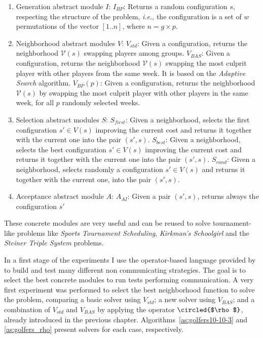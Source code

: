 \begin{enumerate}
	\item Generation abstract module $I$:
	\subitem $I_{BP}$: Returns a random configuration $s$, respecting the structure of the problem, {\it i.e.}, the configuration is a set of $w$ permutations of the vector $[1..n]$, where $n=g\times p$.
	\item Neighborhood abstract modules $V$:
	\subitem $V_{std}$: Given a configuration, returns the neighborhood $\mathcal{V}\left(s\right)$ swapping players among groups.
	\subitem $V_{BAS}$: Given a configuration, returns the neighborhood $\mathcal{V}\left(s\right)$ swapping the most culprit player with other players from the same week. It is based on the {\it Adaptive Search} algorithm.
	\subitem $V_{BP}(p)$: Given a configuration, returns the neighborhood $\mathcal{V}\left(s\right)$ by swapping the most culprit player with other players in the same week, for all $p$ randomly selected weeks.
	\item Selection abstract modules $S$:
	\subitem $S_{first}$: Given a neighborhood, selects the first configuration $s' \in V\left(s\right)$ improving the current cost and returns it together with the current one into the pair $\left(s', s\right)$.
	\subitem $S_{best}$: Given a neighborhood, selects the best configuration $s' \in V\left(s\right)$ improving the current cost and returns it together with the current one into the pair $\left(s', s\right)$.
	\subitem $S_{rand}$: Given a neighborhood, selects randomly a configuration $s' \in V\left(s\right)$ and returns it together with the current one, into the pair $\left(s', s\right)$.
	\item Acceptance abstract module $A$:
	\subitem $A_{AI}$: Given a pair $\left(s', s\right)$, returns always the configuration $s'$
\end{enumerate}

These concrete modules are very useful and can be reused to solve tournament-like problems like \textit{Sports Tournament Scheduling}, \textit{Kirkman's Schoolgirl} and the \textit{Steiner Triple System} problems.

In a first stage of the experiments I use the operator-based language provided by \posl{} to build and test many different non communicating strategies. The goal is to select the best concrete modules to run tests performing communication. A very first experiment was performed to select the best neighborhood function to solve the problem, comparing a basic solver using $V_{std}$; a new solver using $V_{BAS}$; and a combination of $V_{std}$ and $V_{BAS}$ by applying the operator $\circled{$\rho$}$, already introduced in the previous chapter. Algorithms~\ref{as:golfers10-10-3} and \ref{as:golfers_rho} present solvers for each case, respectively.

